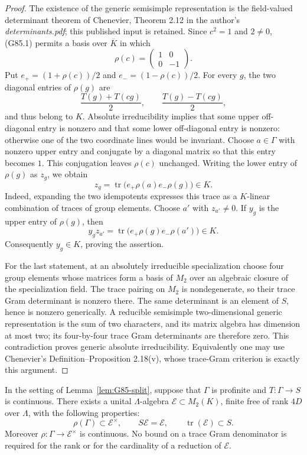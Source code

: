 \begin{proof}
The existence of the generic semisimple representation is the
field-valued determinant theorem of Chenevier, Theorem 2.12 in the
author's \emph{determinants.pdf}; this published input is retained.
Since \(c^2=1\) and \(2\ne0\), (G85.1) permits a basis over
\(\overline K\) in which
\[
 \rho(c)=\begin{pmatrix}1&0\\0&-1\end{pmatrix}.
\]
Put \(e_+=(1+\rho(c))/2\) and \(e_-=(1-\rho(c))/2\).
For every \(g\), the two diagonal entries of \(\rho(g)\) are
\[
 \frac{T(g)+T(cg)}2,\qquad
 \frac{T(g)-T(cg)}2,
 \tag{G85.2}
\]
and thus belong to \(K\).
Absolute irreducibility implies that some upper off-diagonal entry is
nonzero and that some lower off-diagonal entry is nonzero: otherwise
one of the two coordinate lines would be invariant.
Choose \(a\in\Gamma\) with nonzero upper entry and conjugate by a
diagonal matrix so that this entry becomes \(1\).
This conjugation leaves \(\rho(c)\) unchanged.
Writing the lower entry of \(\rho(g)\) as \(z_g\), we obtain
\[
 z_g=\operatorname{tr}\bigl(e_+\rho(a)e_-\rho(g)\bigr)\in K.
 \tag{G85.3}
\]
Indeed, expanding the two idempotents expresses this trace as a
\(K\)-linear combination of traces of group elements.
Choose \(a'\) with \(z_{a'}\ne0\).
If \(y_g\) is the upper entry of \(\rho(g)\), then
\[
 y_g z_{a'}=
 \operatorname{tr}\bigl(e_+\rho(g)e_-\rho(a')\bigr)\in K.
\]
Consequently \(y_g\in K\), proving the assertion.

For the last statement, at an absolutely irreducible specialization
choose four group elements whose matrices form a basis of
\(M_2\) over an algebraic closure of the specialization field.
The trace pairing on \(M_2\) is nondegenerate, so their trace Gram
determinant is nonzero there. The same determinant is an element of
\(S\), hence is nonzero generically. A reducible semisimple
two-dimensional generic representation is the sum of two characters,
and its matrix algebra has dimension at most two; its four-by-four
trace Gram determinants are therefore zero. This contradiction proves
generic absolute irreducibility.
Equivalently one may use Chenevier's
Definition--Proposition 2.18(v), whose trace-Gram criterion is exactly
this argument.
\end{proof}

\begin{proposition}
\label{prop:G85-order}
In the setting of Lemma~\ref{lem:G85-split}, suppose that \(\Gamma\)
is profinite and \(T:\Gamma\to S\) is continuous.
There exists a unital \(\Lambda\)-algebra
\(\mathcal E\subset M_2(K)\), finite free of rank \(4D\) over
\(\Lambda\), with the following properties:
\[
 \rho(\Gamma)\subset\mathcal E^\times,\qquad
 S\mathcal E=\mathcal E,\qquad
 \operatorname{tr}(\mathcal E)\subset S.
 \tag{G85.4}
\]
Moreover \(\rho:\Gamma\to\mathcal E^\times\) is continuous.
No bound on a trace Gram denominator is required for the rank
or for the cardinality of a reduction of \(\mathcal E\).
\end{proposition}

